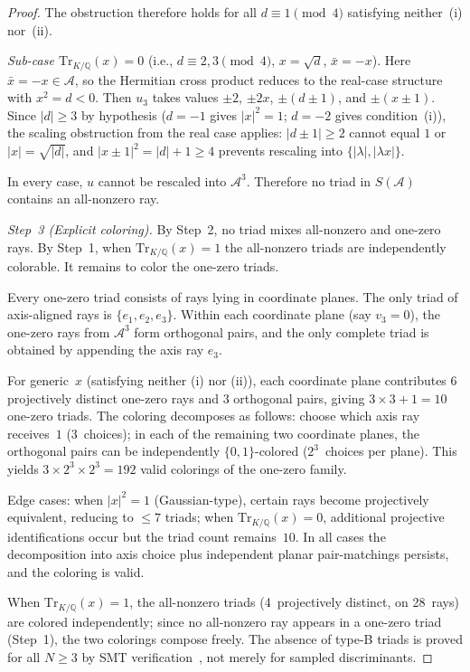 \documentclass[12pt,a4paper]{article}
\newcommand{\Q}{\mathbb{Q}}
\newcommand{\Tr}[1]{\mathrm{Tr}_{K/\Q}\!\left(#1\right)}
\begin{document}
\begin{proof}
The obstruction therefore holds for all $d \equiv 1 \pmod{4}$
satisfying neither~(i) nor~(ii).

\emph{Sub-case $\Tr{x} = 0$} (i.e., $d \equiv 2, 3 \pmod{4}$,
$x = \sqrt{d}$, $\bar{x} = -x$).
Here $\bar{x} = -x \in \mathcal{A}$, so the Hermitian cross product
reduces to the real-case structure with $x^2 = d < 0$.  Then $u_3$
takes values $\pm 2$, $\pm 2x$, $\pm(d \pm 1)$, and $\pm(x \pm 1)$.
Since $|d| \geq 3$ by hypothesis ($d = -1$ gives $|x|^2 = 1$;
$d = -2$ gives condition~(i)), the scaling obstruction from the real
case applies: $|d \pm 1| \geq 2$ cannot equal $1$ or $|x| =
\sqrt{|d|}$, and $|x \pm 1|^2 = |d| + 1 \geq 4$ prevents rescaling
into $\{|\lambda|, |\lambda x|\}$.

In every case, $u$ cannot be rescaled into $\mathcal{A}^3$.  Therefore
no triad in $S(\mathcal{A})$ contains an all-nonzero ray.

\medskip
\noindent\textit{Step~3 (Explicit coloring).}
By Step~2, no triad mixes all-nonzero and one-zero rays.
By Step~1, when $\Tr{x} = 1$ the all-nonzero triads are independently
colorable.  It remains to color the one-zero triads.

Every one-zero triad consists of rays lying in coordinate
planes.  The only triad of axis-aligned rays is
$\{e_1, e_2, e_3\}$.  Within each coordinate plane (say $v_3 = 0$),
the one-zero rays from $\mathcal{A}^3$ form orthogonal pairs, and the
only complete triad is obtained by appending the axis ray $e_3$.

For generic~$x$ (satisfying neither (i) nor (ii)), each coordinate
plane contributes 6 projectively distinct one-zero rays and 3
orthogonal pairs, giving $3 \times 3 + 1 = 10$ one-zero triads.  The
coloring decomposes as follows: choose which axis ray receives~$1$
(3~choices); in each of the remaining two coordinate planes, the
orthogonal pairs can be independently $\{0,1\}$-colored
($2^3$~choices per plane).  This yields $3 \times 2^3 \times 2^3 =
192$ valid colorings of the one-zero family.

Edge cases: when $|x|^2 = 1$ (Gaussian-type), certain rays become
projectively equivalent, reducing to $\leq 7$ triads; when $\Tr{x} =
0$, additional projective identifications occur but the triad count
remains~$10$.  In all cases the decomposition into axis choice plus
independent planar pair-matchings persists, and the coloring is valid.

When $\Tr{x} = 1$, the all-nonzero triads (4~projectively distinct,
on 28~rays) are colored independently; since no all-nonzero ray
appears in a one-zero triad (Step~1), the two colorings compose
freely.  The absence of type-B triads is proved for all $N \geq 3$
by SMT verification~\cite{deMouraBjorner2008}, not merely for
sampled discriminants.
\end{proof}
\end{document}
